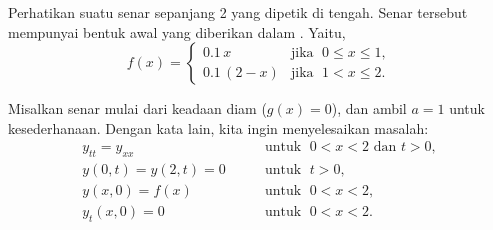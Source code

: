 \begin{example} \label{example:pluckedstring}
Perhatikan suatu senar sepanjang 2 yang dipetik di tengah.
Senar tersebut mempunyai bentuk awal yang diberikan dalam .
Yaitu,
\begin{equation*}
f(x) = \begin{cases}
0.1\, x & \text{jika } \; 0 \leq x \leq 1 , \\
0.1\, (2-x) & \text{jika } \; 1 < x \leq 2 .
\end{cases}
\end{equation*}

\begin{myfig}
\capstart
{}
\caption{Bentuk awal senar yang dipetik dari
.\label{wave:pluckedstrfig}}
\end{myfig}

Misalkan senar mulai dari keadaan diam ($g(x) =
0$), dan ambil $a=1$ untuk kesederhanaan.  Dengan kata lain, kita ingin
menyelesaikan masalah:
\begin{equation*}
\begin{array}{ll}
y_{tt} = y_{xx} & \qquad \text{untuk } \; 0 < x < 2 \text{ dan } t > 0, \\
y(0,t) = y(2,t)= 0 & \qquad \text{untuk } \; t > 0 , \\
y(x,0) = f(x) & \qquad \text{untuk } \; 0 < x < 2 , \\
y_t(x,0)= 0 & \qquad \text{untuk } \; 0 < x < 2.
\end{array}
\end{equation*}


\end{example}
